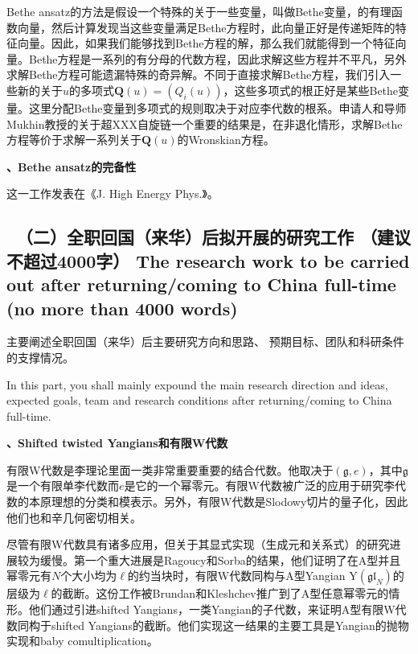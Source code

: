 \documentclass[12pt,UTF8,AutoFakeBold=4,a4paper]{ctexart}
\begin{document}
Bethe ansatz的方法是假设一个特殊的关于一些变量，叫做Bethe变量，的有理函数向量，然后计算发现当这些变量满足Bethe方程时，此向量正好是传递矩阵的特征向量。因此，如果我们能够找到Bethe方程的解，那么我们就能得到一个特征向量。Bethe方程是一系列的有分母的代数方程，因此求解这些方程并不平凡，另外求解Bethe方程可能遗漏特殊的奇异解。不同于直接求解Bethe方程，我们引入一些新的关于$u$的多项式$\bm Q(u)=(Q_i(u))$，这些多项式的根正好是某些Bethe变量。这里分配Bethe变量到多项式的规则取决于对应李代数的根系。申请人和导师Mukhin教授的关于超XXX自旋链一个重要的结果是，在非退化情形，求解Bethe方程等价于求解一系列关于$\bm Q(u)$的Wronskian方程。

\medskip

\textbf{、Bethe ansatz的完备性}

这一工作发表在《J. High Energy Phys.》。

{\color{MsBlue} \subsection{\sihao \kaishu \qquad \ 
\textbf{（二）全职回国（来华）后拟开展的研究工作} {\normalfont（建议不超过4000字）} 
\bfseries \xiaosihao {} 
The research work to 
be carried out after returning/coming to China full-time (no more than 4000 words)} 
}

 

{\sihao \color{MsBlue} \kaishu 主要阐述全职回国（来华）后主要研究方向和思路、
预期目标、团队和科研条件的支撑情况。}

\medskip

{\color{MsBlue}  
In this part, you shall mainly expound the main research direction and ideas, 
expected goals, team and research conditions after returning/coming to China 
full-time.}

\medskip

\textbf{、Shifted twisted Yangians和有限W代数}

有限W代数是李理论里面一类非常重要重要的结合代数。他取决于$(\mathfrak g,e)$，其中$\mathfrak g$是一个有限单李代数而$e$是它的一个幂零元。有限W代数被广泛的应用于研究李代数的本原理想的分类和模表示。另外，有限W代数是Slodowy切片的量子化，因此他们也和辛几何密切相关。

尽管有限W代数具有诸多应用，但关于其显式实现（生成元和关系式）的研究进展较为缓慢。第一个重大进展是Ragoucy和Sorba的结果，他们证明了在A型并且幂零元有$N$个大小均为$\ell$的约当块时，有限W代数同构与A型Yangian $\mathrm{Y}(\mathfrak{gl}_N)$的层级为$\ell$的截断。这份工作被Brundan和Kleshchev推广到了A型任意幂零元的情形。他们通过引进shifted Yangians，一类Yangian的子代数，来证明A型有限W代数同构于shifted Yangians的截断。他们实现这一结果的主要工具是Yangian的抛物实现和baby comultiplication。
\end{document}
